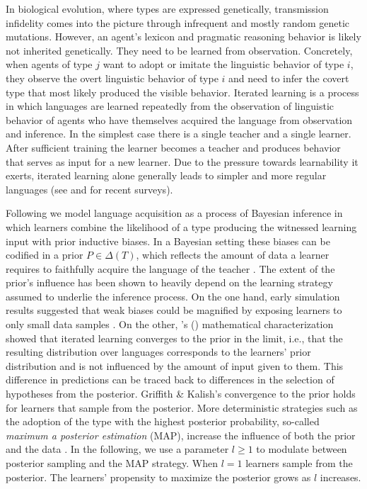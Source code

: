 \documentclass[a4paper, 11pt]{article}
\theoremstyle{Satz}
\newcommand{\citeposs}[2][]{\citeauthor{#2}'s (\citeyear[#1]{#2})}
\begin{document}
In biological evolution, where types are expressed genetically, transmission infidelity comes
into the picture through infrequent and mostly random genetic mutations. However, an agent's
lexicon and pragmatic reasoning behavior is likely not inherited genetically. They need to be
learned from observation. Concretely, when agents of type $j$ want to adopt or imitate the
linguistic behavior of type $i$, they observe the overt linguistic behavior of type $i$ and
need to infer the covert type that most likely produced the visible behavior. Iterated learning
is a process in which languages are learned repeatedly from the observation of linguistic
behavior of agents who have themselves acquired the language from observation and inference. In
the simplest case there is a single teacher and a single learner. After sufficient training the
learner becomes a teacher and produces behavior that serves as input for a new learner. Due to
the pressure towards learnability it exerts, iterated learning alone generally leads to simpler
and more regular languages (see \citealt{kirby+etal:2014} and \citealt{tamariz+kirby:2016} for
recent surveys).

Following \citet{griffiths+kalish:2007} we model language acquisition as a process of Bayesian
inference in which learners combine the likelihood of a type producing the witnessed learning
input with prior inductive biases. In a Bayesian setting these biases can be codified in a prior
$P \in \Delta(T)$, which reflects the amount of data a learner requires to faithfully acquire
the language of the teacher \citep[cf.][450]{griffiths+kalish:2007}. The extent of the prior's
influence has been shown to heavily depend on the learning strategy assumed to underlie the
inference process. On the one hand, early simulation results suggested that weak biases could
be magnified by exposing learners to only small data samples
\citep[e.g. in][]{brighton:2002}. On the other, \citeposs{griffiths+kalish:2007} mathematical
characterization showed that iterated learning converges to the prior in the limit, i.e., that
the resulting distribution over languages corresponds to the learners' prior distribution and
is not influenced by the amount of input given to them. This difference in predictions can be
traced back to differences in the selection of hypotheses from the posterior. Griffith \&
Kalish's convergence to the prior holds for learners that sample from the posterior. More
deterministic strategies such as the adoption of the type with the highest posterior
probability, so-called {\it maximum a posterior estimation} (MAP), increase the influence of
both the prior and the data \citep{griffiths+kalish:2007,kirby+etal:2007}. In the following, we
use a parameter $l\ge1$ to modulate between posterior sampling and the MAP strategy. When
$l = 1$ learners sample from the posterior. The learners' propensity to maximize the posterior
grows as $l$ increases.
\end{document}
